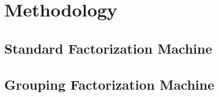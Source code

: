 \chapter{Methodology}



\section{Standard Factorization Machine}

\section{Grouping Factorization Machine}
